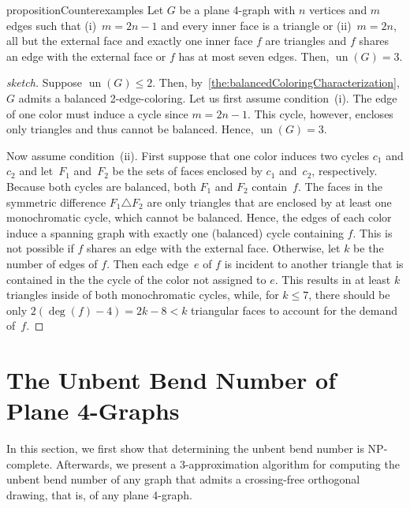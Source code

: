 \documentclass[runningheads]{llncs}
\newcommand{\restateref}[1]{\IfAppendix{\hyperref[#1]{$\star$}}{\hyperref[#1*]{$\star$}}}
\newcommand{\un}{\operatorname{un}}
\begin{document}
\begin{restatable}[\restateref{pro:counterexamples}]{proposition}{Counterexamples}
  \label{pro:counterexamples}
  Let $G$ be a plane 4-graph with $n$ vertices and $m$ edges such that
     (i)~$m=2n-1$ and every inner face is a triangle or
     (ii)~$m=2n$, all but the external face and exactly one inner face $f$ are triangles and 
     $f$ shares an edge with the external face or %
     $f$ has at most seven edges.   
  Then, $\un(G)=3$.   
\end{restatable}

\begin{proof}[sketch]
  Suppose $\un(G)\le 2$.  Then, by~\cref{the:balancedColoringCharacterization}, $G$ admits a balanced 2-edge-coloring.
  Let us first assume condition~(i). %
  The edge of one color must induce a cycle since $m=2n-1$.
  This cycle, however, encloses only triangles and thus cannot be balanced. Hence, $\un(G)=3$.

  Now assume condition~(ii). %
  First suppose that one color induces two cycles $c_1$ and $c_2$
  and let~$F_1$ and~$F_2$ be the sets of faces
  enclosed by $c_1$ and~$c_2$, respectively.
  Because both cycles are balanced, both $F_1$ and $F_2$ contain~$f$.
  The faces in the symmetric difference $F_1 \triangle F_2$ are only triangles
  that are enclosed by at least one monochromatic cycle, which cannot be balanced.
  Hence, the edges of each color induce a spanning graph with exactly one (balanced) cycle containing $f$.
  This is not possible if $f$ shares an edge with the external face. Otherwise, let $k$ be the number of edges of $f$.
  Then each edge~$e$ of $f$ is incident to another triangle that is contained in the the cycle of the color not assigned to $e$.
  This results in at least $k$ triangles inside of both monochromatic cycles,
  while, for $k \le 7$, there should be only $2(\deg(f)-4)=2k-8<k$ triangular faces to account for
  the demand of~$f$.  
\end{proof}










\section{The Unbent Bend Number of Plane 4-Graphs}
\label{se:bends}

In this section, we first show that determining the unbent bend number is NP-complete.
Afterwards, we present a 3-approximation algorithm for computing the unbent bend number of any graph that admits a crossing-free orthogonal 
drawing, that is, of any plane 4-graph. 
\end{document}
